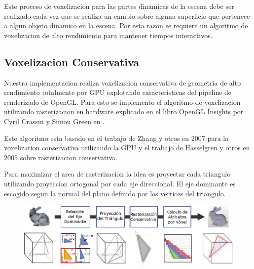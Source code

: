 Este proceso de voxelizacion para las partes dinamicas de la escena debe ser realizado cada vez que se realiza un cambio sobre alguna superficie que pertenece a algun objeto dinamico en la escena. Por esta razon se requiere un algoritmo de voxelizacion de alto rendimiento para mantener tiempos interactivos.

\subsection{Voxelizacion Conservativa} %
\label{sub:voxelizacion_conservativa}
Nuestra implementacion realiza voxelizacion conservativa de geometria de alto rendimiento totalmente por \ac{GPU} explotando caracteristicas del pipeline de renderizado de OpenGL. Para esto se implemento el algoritmo de voxelizacion utilizando rasterizacion en hardware explicado en el libro OpenGL Insights por Cyril Crassin y Simon Green en  \cite{CozziRiccio12}. 


Este algoritmo esta basado en el trabajo de Zhang y otros en 2007 \cite{zhang2007conservative} para la voxelization conservativa utilizando la \ac{GPU} y el trabajo de Hasselgren y otros en 2005 \cite{hasselgren2005conservative} sobre rasterizacion conservativa.

Para maximizar el area de rasterizacion la idea es proyectar cada triangulo utilizando proyeccion ortogonal por cada eje direccional. El eje dominante es escogido segun la normal del plano definido por los vertices del triangulo.

\begin{figure}[H]
	\centering
	\captionsetup{justification=centering}
	\includegraphics[width=\linewidth]{media/voxelization_pipeline.eps}
\end{figure}
 
